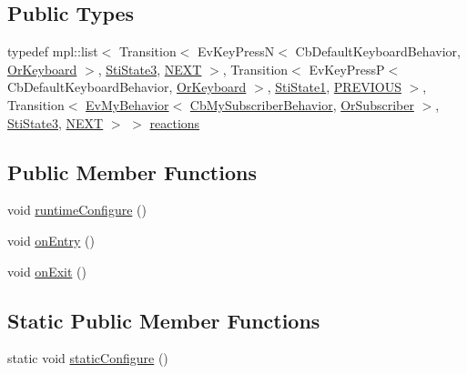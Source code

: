\subsection*{Public Types}
\begin{DoxyCompactItemize}
\item 
typedef mpl\+::list$<$ Transition$<$ Ev\+Key\+PressN$<$ Cb\+Default\+Keyboard\+Behavior, \hyperlink{classsm__ferrari_1_1OrKeyboard}{Or\+Keyboard} $>$, \hyperlink{structsm__ferrari_1_1inner__states_1_1StiState3}{Sti\+State3}, \hyperlink{structsm__ferrari_1_1inner__states_1_1StiState2_1_1NEXT}{N\+E\+XT} $>$, Transition$<$ Ev\+Key\+PressP$<$ Cb\+Default\+Keyboard\+Behavior, \hyperlink{classsm__ferrari_1_1OrKeyboard}{Or\+Keyboard} $>$, \hyperlink{structsm__ferrari_1_1inner__states_1_1StiState1}{Sti\+State1}, \hyperlink{structsm__ferrari_1_1inner__states_1_1StiState2_1_1PREVIOUS}{P\+R\+E\+V\+I\+O\+US} $>$, Transition$<$ \hyperlink{structsm__ferrari_1_1cl__subscriber_1_1EvMyBehavior}{Ev\+My\+Behavior}$<$ \hyperlink{classsm__ferrari_1_1cl__subscriber_1_1CbMySubscriberBehavior}{Cb\+My\+Subscriber\+Behavior}, \hyperlink{classsm__ferrari_1_1OrSubscriber}{Or\+Subscriber} $>$, \hyperlink{structsm__ferrari_1_1inner__states_1_1StiState3}{Sti\+State3}, \hyperlink{structsm__ferrari_1_1inner__states_1_1StiState2_1_1NEXT}{N\+E\+XT} $>$ $>$ \hyperlink{structsm__ferrari_1_1inner__states_1_1StiState2_a7d4fde8004c6246634ada4f85a371b9f}{reactions}
\end{DoxyCompactItemize}
\subsection*{Public Member Functions}
\begin{DoxyCompactItemize}
\item 
void \hyperlink{structsm__ferrari_1_1inner__states_1_1StiState2_a232db965739ca651217451b286940d49}{runtime\+Configure} ()
\item 
void \hyperlink{structsm__ferrari_1_1inner__states_1_1StiState2_a6369802f0a94bfd140bde808ed859f73}{on\+Entry} ()
\item 
void \hyperlink{structsm__ferrari_1_1inner__states_1_1StiState2_ae8a355b69ad90e3c16b7254d9cb4dd04}{on\+Exit} ()
\end{DoxyCompactItemize}
\subsection*{Static Public Member Functions}
\begin{DoxyCompactItemize}
\item 
static void \hyperlink{structsm__ferrari_1_1inner__states_1_1StiState2_abcd572142d795998100e52204cf939a9}{static\+Configure} ()
\end{DoxyCompactItemize}
